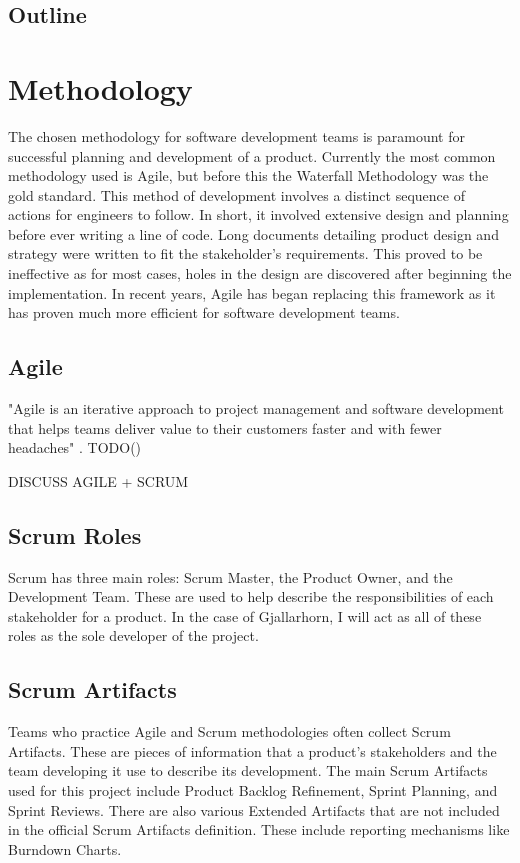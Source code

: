 \documentclass{article}
\begin{document}
\subsection{Outline}



\section{Methodology}
The chosen methodology for software development teams is paramount for successful planning
and development of a product. Currently the most common methodology used is Agile, but before
this the Waterfall Methodology was the gold standard. This method of development involves a distinct
sequence of actions for engineers to follow. In short, it involved extensive design and planning
before ever writing a line of code. Long documents detailing product design and strategy were 
written to fit the stakeholder's requirements. This proved to be ineffective as for most cases,
holes in the design are discovered after beginning the implementation. In recent years, Agile has
began replacing this framework as it has proven much more efficient for software development teams.



\subsection{Agile}
"Agile is an iterative approach to project management and software development that helps teams
deliver value to their customers faster and with fewer headaches" \cite{what-is-agile}. TODO()


DISCUSS AGILE + SCRUM

\subsection{Scrum Roles}
Scrum has three main roles: Scrum Master, the Product Owner, and the Development Team. These are
used to help describe the responsibilities of each stakeholder for a product. In the case of Gjallarhorn,
I will act as all of these roles as the sole developer of the project.


\subsection{Scrum Artifacts}
Teams who practice Agile and Scrum methodologies often collect Scrum Artifacts. These 
are pieces of information that a product's stakeholders and the team developing it use to 
describe its development. The main Scrum Artifacts used for this project include Product Backlog
Refinement, Sprint Planning, and Sprint Reviews. There are also various Extended Artifacts
that are not included in the official Scrum Artifacts definition. These include reporting mechanisms like
Burndown Charts.
\end{document}
